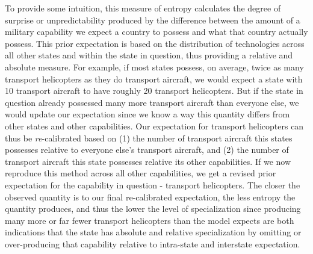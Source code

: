 \documentclass[
  12,
  letterpaper,
  DIV=11,
  numbers=noendperiod]{scrartcl}
\begin{document}
To provide some intuition, this measure of entropy calculates the degree
of surprise or unpredictability produced by the difference between the
amount of a military capability we expect a country to possess and what
that country actually possess. This prior expectation is based on the
distribution of technologies across all other states and within the
state in question, thus providing a relative and absolute measure. For
example, if most states possess, on average, twice as many transport
helicopters as they do transport aircraft, we would expect a state with
10 transport aircraft to have roughly 20 transport helicopters. But if
the state in question already possessed many more transport aircraft
than everyone else, we would update our expectation since we know a way
this quantity differs from other states and other capabilities. Our
expectation for transport helicopters can thus be \emph{re}-calibrated
based on (1) the number of transport aircraft this states possesses
relative to everyone else's transport aircraft, and (2) the number of
transport aircraft this state possesses relative its other capabilities.
If we now reproduce this method across all other capabilities, we get a
revised prior expectation for the capability in question - transport
helicopters. The closer the observed quantity is to our final
re-calibrated expectation, the less entropy the quantity produces, and
thus the lower the level of specialization since producing many more or
far fewer transport helicopters than the model expects are both
indications that the state has absolute and relative specialization by
omitting or over-producing that capability relative to intra-state and
interstate expectation.
\end{document}
